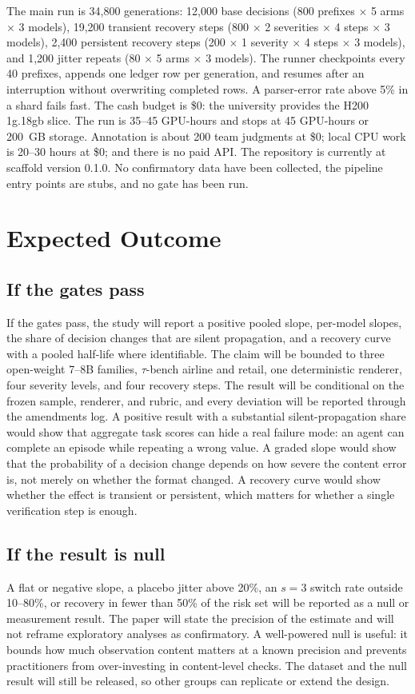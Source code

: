\documentclass[11pt,a4paper]{article}
\begin{document}
The main run is 34,800 generations: 12,000 base decisions (800 prefixes $\times$ 5 arms $\times$ 3
models), 19,200 transient recovery steps (800 $\times$ 2 severities $\times$ 4 steps $\times$ 3
models), 2,400 persistent recovery steps (200 $\times$ 1 severity $\times$ 4 steps $\times$ 3
models), and 1,200 jitter repeats (80 $\times$ 5 arms $\times$ 3 models). The runner checkpoints
every 40 prefixes, appends one ledger row per generation, and resumes after an interruption without
overwriting completed rows. A parser-error rate above 5\% in a shard fails fast. The cash budget is
\$0: the university provides the H200 1g.18gb slice. The run is 35--45 GPU-hours and stops at
45 GPU-hours or 200~GB storage. Annotation is about 200 team judgments at \$0; local CPU work is
20--30 hours at \$0; and there is no paid API. The repository is currently at scaffold version
0.1.0. No confirmatory data have been
collected, the pipeline entry points are stubs, and no gate has been run.

\section{Expected Outcome}

\subsection{If the gates pass}
If the gates pass, the study will report a positive pooled slope, per-model slopes, the share of
decision changes that are silent propagation, and a recovery curve with a pooled half-life where
identifiable. The claim will be bounded to three open-weight 7--8B families, $\tau$-bench airline
and retail, one deterministic renderer, four severity levels, and four recovery steps. The result
will be conditional on the frozen sample, renderer, and rubric, and every deviation will be
reported through the amendments log. A positive result with a substantial silent-propagation share would show that aggregate task scores
can hide a real failure mode: an agent can complete an episode while repeating a wrong value. A
graded slope would show that the probability of a decision change depends on how severe the content
error is, not merely on whether the format changed. A recovery curve would show whether the effect
is transient or persistent, which matters for whether a single verification step is enough.

\subsection{If the result is null}
A flat or negative slope, a placebo jitter above 20\%, an $s=3$ switch rate outside 10--80\%, or
recovery in fewer than 50\% of the risk set will be reported as a null or measurement result. The
paper will state the precision of the estimate and will not reframe exploratory analyses as
confirmatory. A well-powered null is useful: it bounds how much observation content matters at a
known precision and prevents practitioners from over-investing in content-level checks. The dataset
and the null result will still be released, so other groups can replicate or extend the design.
\end{document}
